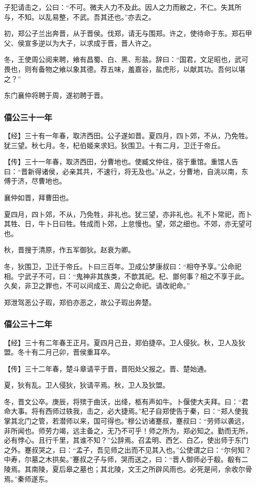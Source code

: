 \documentclass[]{article}
\begin{document}
子犯请击之，公曰：``不可。微夫人力不及此。因人之力而敝之，不仁。失其所与，不知。以乱易整，不武。吾其还也。''亦去之。

初，郑公子兰出奔晋，从于晋侯。伐郑，请无与围郑。许之，使待命于东。郑石甲父、侯宣多逆以为大子，以求成于晋，晋人许之。

冬，王使周公阅来聘，飨有昌蜀、白、黑、形盐。辞曰：``国君，文足昭也，武可畏也，则有备物之飨以象其德。荐五味，羞嘉谷，盐虎形，以献其功。吾何以堪之？''

东门襄仲将聘于周，遂初聘于晋。

\hypertarget{header-n1010}{%
\subsubsection{僖公三十一年}\label{header-n1010}}

【经】三十有一年春，取济西田。公子遂如晋。夏四月，四卜郊，不从，乃免牲。犹三望。秋七月。冬，杞伯姬来求妇。狄围卫。十有二月，卫迁于帝丘。

【传】三十一年春，取济西田，分曹地也。使臧文仲往，宿于重馆。重馆人告曰：``晋新得诸侯，必亲其共，不速行，将无及也。''从之，分曹地，自洮以南，东傅于济，尽曹地也。

襄仲如晋，拜曹田也。

夏四月，四卜郊，不从，乃免牲，非礼也。犹三望，亦非礼也。礼不卜常祀，而卜其牲、日，牛卜日曰牲。牲成而卜郊，上怠慢也。望，郊之细也。不郊，亦无望可也。

秋，晋搜于清原，作五军御狄。赵衰为卿。

冬，狄围卫，卫迁于帝丘。卜曰三百年。卫成公梦康叔曰：``相夺予享。''公命祀相。宁武子不可，曰：``鬼神非其族类，不歆其祀。杞、鄫何事？相之不享于此。久矣，非卫之罪也，不可以间成王、周公之命祀。请改祀命。''

郑泄驾恶公子瑕，郑伯亦恶之，故公子瑕出奔楚。

\hypertarget{header-n1020}{%
\subsubsection{僖公三十二年}\label{header-n1020}}

【经】三十有二年春王正月。夏四月己丑，郑伯捷卒。卫人侵狄。秋，卫人及狄盟。冬十有二月己卯，晋侯重耳卒。

【传】三十二年春，楚斗章请平于晋，晋阳处父报之。晋、楚始通。

夏，狄有乱。卫人侵狄，狄请平焉。秋，卫人及狄盟。

冬，晋文公卒。庚辰，将殡于曲沃，出绛，柩有声如牛。卜偃使大夫拜。曰：``君命大事。将有西师过轶我，击之，必大捷焉。''杞子自郑使告于秦，曰：``郑人使我掌其北门之管，若潜师以来，国可得也。''穆公访诸蹇叔，蹇叔曰：``劳师以袭远，非所闻也。师劳力竭，远主备之，无乃不可乎！师之所为，郑必知之。勤而无所，必有悖心。且行千里，其谁不知？''公辞焉。召孟明、西乞、白乙，使出师于东门之外。蹇叔哭之，曰：``孟子，吾见师之出而不见其入也。''公使谓之曰：``尔何知？中寿，尔墓之木拱矣。''蹇叔之子与师，哭而送之，曰：``晋人御师必于殽。殽有二陵焉。其南陵，夏后皋之墓也；其北陵，文王之所辟风雨也。必死是间，余收尔骨焉。''秦师遂东。
\end{document}
